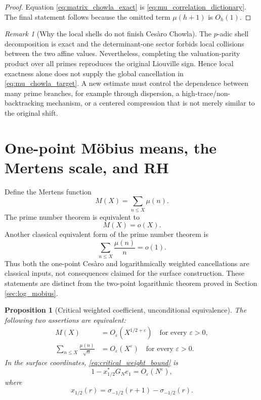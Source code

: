 \documentclass[11pt]{amsart}
\numberwithin{equation}{section}
\theoremstyle{plain}
\newtheorem{proposition}[theorem]{Proposition}
\theoremstyle{definition}
\theoremstyle{remark}
\newtheorem{remark}[theorem]{Remark}
\newcommand{\eps}{\varepsilon}
\newcommand{\mob}{\mu}
\begin{document}
\begin{proof}
Equation \eqref{eq:matrix_chowla_exact} is \eqref{eq:mu_correlation_dictionary}.  The final statement follows because the omitted term $\mob(h+1)$ is $O_h(1)$.
\end{proof}

\begin{remark}[Why the local shells do not finish Cesàro Chowla]
\label{rem:local_not_global}
The $p$-adic shell decomposition is exact and the determinant-one sector forbids local collisions between the two affine values.  Nevertheless, completing the valuation-parity product over all primes reproduces the original Liouville sign.  Hence local exactness alone does not supply the global cancellation in \eqref{eq:mu_chowla_target}.  A new estimate must control the dependence between many prime branches, for example through dispersion, a high-trace/non-backtracking mechanism, or a centered compression that is not merely similar to the original shift.
\end{remark}

\section{One-point Möbius means, the Mertens scale, and RH}
\label{sec:mertens_rh}

Define the Mertens function
\begin{equation}
M(X)=\sum_{n\le X}\mob(n).
\label{eq:Mertens_definition}
\end{equation}
The prime number theorem is equivalent to
\begin{equation}
M(X)=o(X).
\label{eq:PNT_Mertens}
\end{equation}
Another classical equivalent form of the prime number theorem is
\begin{equation}
\sum_{n\le X}\frac{\mob(n)}n=o(1).
\label{eq:one_point_log_mu}
\end{equation}
Thus both the one-point Cesàro and logarithmically weighted cancellations are classical inputs, not consequences claimed for the surface construction.
These statements are distinct from the two-point logarithmic theorem proved in Section \ref{sec:log_mobius}.

\begin{proposition}[Critical weighted coefficient, unconditional equivalence]
\label{prop:critical_weight_RH}
The following two assertions are equivalent:
\begin{align}
M(X)&=O_\eps(X^{1/2+\eps})\quad\text{for every }\eps>0,
\label{eq:Mertens_RH_scale}\\
\sum_{n\le X}\frac{\mob(n)}{\sqrt n}
&=O_\eps(X^\eps)\quad\text{for every }\eps>0.
\label{eq:critical_weight_bound}
\end{align}
In the surface coordinates, \eqref{eq:critical_weight_bound} is
\begin{equation}
1-x_{1/2}^*G_Ne_1=O_\eps(N^\eps),
\label{eq:critical_matrix_coefficient}
\end{equation}
where
\begin{equation}
x_{1/2}(r)=\sigma_{-1/2}(r+1)-\sigma_{-1/2}(r).
\label{eq:x_half}
\end{equation}
\end{proposition}
\end{document}

